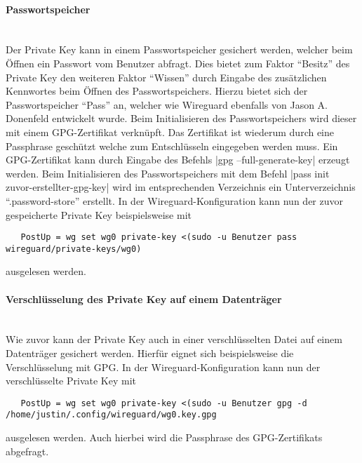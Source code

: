 \paragraph{Passwortspeicher} 
\noindent \\Der Private Key kann in einem Passwortspeicher gesichert werden, welcher beim \"Offnen ein Passwort vom Benutzer abfragt. Dies bietet zum Faktor "`Besitz"' des Private Key den weiteren Faktor "`Wissen"' durch Eingabe des zus\"atzlichen Kennwortes beim \"Offnen des Passwortspeichers. Hierzu bietet sich der Passwortspeicher "`Pass"' an, welcher wie Wireguard ebenfalls von Jason A. Donenfeld entwickelt wurde. Beim Initialisieren des Passwortspeichers wird dieser mit einem GPG-Zertifikat verknüpft. Das Zertifikat ist wiederum durch eine Passphrase gesch\"utzt welche zum Entschlüsseln eingegeben werden muss.
Ein GPG-Zertifikat kann durch Eingabe des Befehls |gpg --full-generate-key| erzeugt werden. Beim Initialisieren des Passwortspeichers mit dem Befehl |pass init zuvor-erstellter-gpg-key| wird im entsprechenden Verzeichnis ein Unterverzeichnis \enquote{.password-store} erstellt. In der Wireguard-Konfiguration kann nun der zuvor gespeicherte Private Key beispielsweise mit 
\begin{verbatim}
   PostUp = wg set wg0 private-key <(sudo -u Benutzer pass wireguard/private-keys/wg0)
\end{verbatim}
ausgelesen werden.

\paragraph{Verschl\"usselung des Private Key auf einem Datentr\"ager}
\noindent \\Wie zuvor kann der Private Key auch in einer verschl\"usselten Datei auf einem Datentr\"ager gesichert werden. Hierfür eignet sich beispielsweise die Verschl\"usselung mit GPG. In der Wireguard-Konfiguration kann nun der verschl\"usselte Private Key mit 
\begin{verbatim}
   PostUp = wg set wg0 private-key <(sudo -u Benutzer gpg -d /home/justin/.config/wireguard/wg0.key.gpg
\end{verbatim}
ausgelesen werden. Auch hierbei wird die Passphrase des GPG-Zertifikats abgefragt. 

